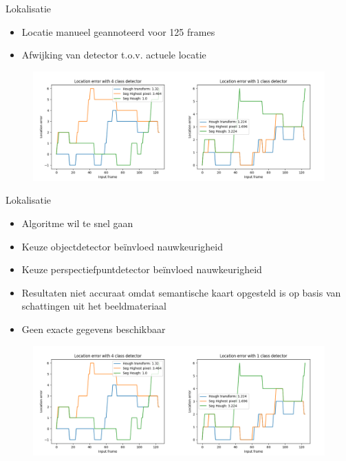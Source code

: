 \documentclass[11pt,t]{beamer}
\begin{document}
\begin{frame}[fragile]{Lokalisatie}
	\begin{itemize}
		\item Locatie manueel geannoteerd voor 125 frames
		\item Afwijking van detector t.o.v. actuele locatie
	\end{itemize}

	\begin{figure}
		\centering
		\includegraphics[width=\linewidth]{graphics/loc_acc.png}
	\end{figure}
\end{frame}

\begin{frame}[fragile]{Lokalisatie}
	\begin{itemize}
		\item Algoritme wil te snel gaan
		\item Keuze objectdetector be\"{i}nvloed nauwkeurigheid
		\item Keuze perspectiefpuntdetector be\"{i}nvloed nauwkeurigheid
		\item Resultaten niet accuraat omdat semantische kaart opgesteld is op basis van schattingen uit het beeldmateriaal
		\item Geen exacte gegevens beschikbaar
	\end{itemize}

	\begin{figure}
		\centering
		\includegraphics[width=0.8\linewidth]{graphics/loc_acc.png}
	\end{figure}
\end{frame}
\end{document}
